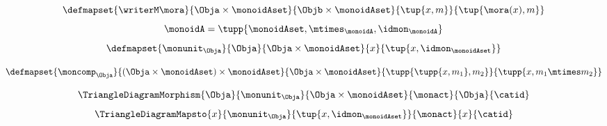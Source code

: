 {\begin{forslides}
        \begin{equation}\label{eq:writer-2}
            \defmapset{
                \writerM \mora
            }{
                \Obja \times \monoidAset
            }{
                \Objb \times \monoidAset
            }{
                \tup{x, m}
            }{
                \tup{\mora(x), m}
            }
        \end{equation}
        \begin{equation}\label{eq:writer-monoid}
            \monoidA = \tupp{\monoidAset, \mtimes_{\monoidA}, \idmon_{\monoidA}}
        \end{equation}
        \begin{equation}\label{eq:writer-comp}
            \defmapset{
                \monunit_\Obja
            }{
                \Obja
            }{
                \Obja \times \monoidAset
            }{
                x
            }{
                \tup{x, \idmon_{\monoidAset}}
            }
        \end{equation}

        \begin{equation}\label{eq:writer-comp2}
            \defmapset{
                \moncomp_\Obja
            }{
                (\Obja \times \monoidAset) \times \monoidAset
            }{
                \Obja \times \monoidAset
            }{
                \tupp{\tupp{x,m_1 }, m_2}
            }{
                \tupp{x, m_1 \mtimes m_2}
            }
        \end{equation}



        \begin{equation}\label{eq:writer-algebra-condition-triangle-domain}
            \TriangleDiagramMorphism{\Obja}{\monunit_\Obja}{\Obja\times\monoidAset}{\monact}{\Obja}{\catid}
        \end{equation}
        \begin{equation}\label{eq:writer-algebra-condition-triangle}
            \TriangleDiagramMapsto{x}{\monunit_\Obja}{\tup{x, \idmon_{\monoidAset}}}{\monact}{x}{\catid}
        \end{equation}


\end{forslides}}
